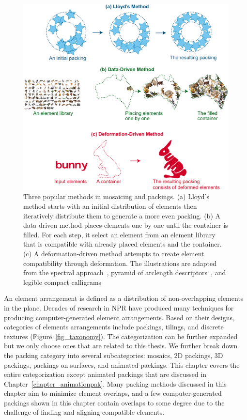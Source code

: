 \begin{figure}
\centering
\includegraphics[width=1.0\textwidth]{figures/related/taxonomy_method.pdf} 
\caption[Three popular methods in mosaicing and packings]
{\label{fig_taxonomy_method} 
\nnewtext
{
Three popular methods in mosaicing and packings.
(a) Lloyd's method starts with an initial distribution of elements then iteratively distribute them
to generate a more even packing. 
(b) A data-driven method places elements one by one until the container is filled.
For each step, it select an element from an element library that is compatible with already placed elements and the container.
(c) A deformation-driven method attempts to create element compatibility through deformation.
The illustrations are adapted from the spectral approach~\cite{Dalal2006}, 
pyramid of arclength descriptors~\cite{Kwan2016}, and
legible compact calligrams~\cite{Zou2016}
}
}
\end{figure}

\nnewtext
{
An element arrangement is defined as a distribution of non-overlapping elements in the plane.
Decades of research in NPR have produced many techniques for producing computer-generated element arrangements.
Based on their designs, categories of elements arrangements include
packings, tilings, and discrete textures (Figure~\ref{fig_taxonomy}).
The categorization can be further expanded but we only choose ones that are related to this thesis.
We further break down the packing category into several subcategories: mosaics, 2D packings, 3D packings, 
packings on surfaces, and animated packings.
This chapter covers the entire categorization except animated packings that are discussed in Chapter~\ref{chapter_animationpak}. 
Many packing methods discussed in this chapter aim to minimize element overlaps, and
a few computer-generated packings shown in this chapter 
contain overlaps to some degree due to the challenge of finding and aligning compatible elements.
}

